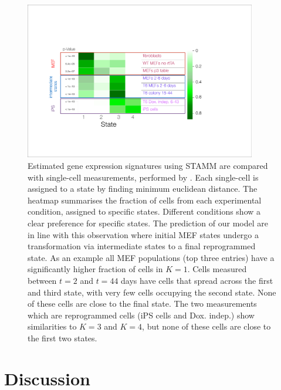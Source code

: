 \begin{figure}
  \centering
  \includegraphics[width=0.9\textwidth]{pics/Heat_single_cells.pdf}
  \caption{Estimated gene expression signatures using STAMM are compared with single-cell measurements, performed by \cite{Buganim:2012hp}. Each single-cell is assigned to a state by finding minimum euclidean distance. The heatmap summarises the fraction of cells from each experimental condition, assigned to specific states. Different conditions show a clear preference for specific states. The prediction of our model are in line with this observation where initial MEF states undergo a transformation via intermediate states to a final reprogrammed state. As an example all MEF populations (top three entries) have a significantly higher fraction of cells in $K=1$. Cells measured between $t=2$ and $t=44$ days have cells that spread across the first and third state, with very few cells occupying the second state. None of these cells are close to the final state. The two measurements which are reprogrammed cells (iPS cells and Dox. indep.) show similarities to $K=3$ and $K=4$, but none of these cells are close to the first two states.
}
  \label{fig:buganim-heat}
\end{figure}

\section{Discussion}
\label{sec:discussion-ips}

